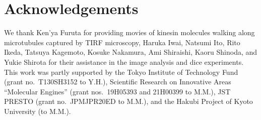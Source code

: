 \documentclass[10pt, aps, prb, preprint, longbibliography, superscriptaddress]{revtex4-2}
\begin{document}
\section{Acknowledgements}
We thank Ken'ya Furuta for providing movies of kinesin molecules walking along microtubules
captured by TIRF microscopy,
Haruka Iwai, Natsumi Ito, Rito Ikeda, Tatsuya Kagemoto, Kosuke Nakamura, Ami Shiraishi,
Kaoru Shinoda, and Yukie Shirota for their assistance in the image analysis and dice experiments.
This work was partly supported by the Tokyo Institute of Technology Fund (grant no.~T130SH3152 to Y.H.),
Scientific Research on Innovative Areas ``Molecular Engines'' (grant nos.~19H05393 and 21H00399 to M.M.),
JST PRESTO (grant no.~JPMJPR20ED to M.M.), and the Hakubi Project of Kyoto University (to M.M.).
\end{document}
